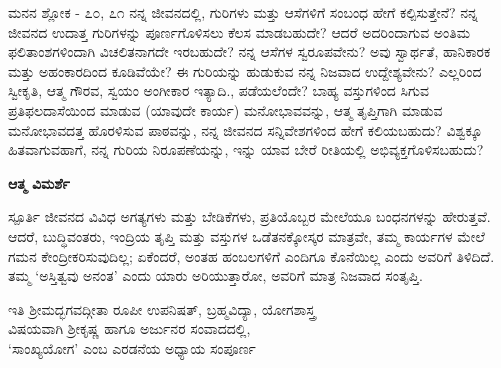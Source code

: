 \newpage
\begin{mananam}{\mananamfont \large \large {ಮನನ ಶ್ಲೋಕ - ೭೦, ೭೧}}
\footnotesize \mananamtext ನನ್ನ ಜೀವನದಲ್ಲಿ, ಗುರಿಗಳು ಮತ್ತು ಆಸೆಗಳಿಗೆ ಸಂಬಂಧ ಹೇಗೆ ಕಲ್ಪಿಸುತ್ತೇನೆ? ನನ್ನ ಜೀವನದ ಉದಾತ್ತ   ಗುರಿಗಳನ್ನು ಪೂರ್ಣಗೊಳಿಸಲು ಕೆಲಸ ಮಾಡಬಹುದೇ? ಆದರೆ ಅದರಿಂದಾಗುವ ಅಂತಿಮ ಫಲಿತಾಂಶಗಳಿಂದಾಗಿ ವಿಚಲಿತನಾಗದೇ ಇರಬಹುದೇ? ನನ್ನ ಆಸೆಗಳ ಸ್ವರೂಪವೇನು? ಅವು ಸ್ವಾರ್ಥತೆ, ಹಾನಿಕಾರಕ ಮತ್ತು ಅಹಂಕಾರದಿಂದ ಕೂಡಿವೆಯೇ? ಈ ಗುರಿಯನ್ನು ಹುಡುಕುವ ನನ್ನ ನಿಜವಾದ ಉದ್ದೇಶ್ಯವೇನು? ಎಲ್ಲರಿಂದ ಸ್ವೀಕೃತಿ, ಆತ್ಮ ಗೌರವ, ಸ್ವಯಂ  ಅಂಗೀಕಾರ ಇತ್ಯಾದಿ., ಪಡೆಯಲೆಂದೇ?  ಬಾಹ್ಯ ವಸ್ತುಗಳಿಂದ ಸಿಗುವ ಪ್ರತಿಫಲದಾಸೆಯಿಂದ ಮಾಡುವ (ಯಾವುದೇ ಕಾರ್ಯ) ಮನೋಭಾವವನ್ನು, ಆತ್ಮ ತೃಪ್ತಿಗಾಗಿ ಮಾಡುವ ಮನೋಭಾವದತ್ತ ಹೊರಳಿಸುವ ಪಾಠವನ್ನು, ನನ್ನ ಜೀವನದ ಸನ್ನಿವೇಶಗಳಿಂದ ಹೇಗೆ ಕಲಿಯಬಹುದು? ವಿಶ್ವಕ್ಕೂ ಹಿತವಾಗುವಹಾಗೆ, ನನ್ನ ಗುರಿಯ ನಿರೂಪಣೆಯನ್ನು, ಇನ್ನು ಯಾವ ಬೇರೆ ರೀತಿಯಲ್ಲಿ  ಅಭಿವ್ಯಕ್ತಗೊಳಿಸಬಹುದು? 
\end{mananam}
\WritingHand\enspace\textbf{ಆತ್ಮ ವಿಮರ್ಶೆ}
\begin{inspiration}{\mananamfont \large \large ಸ್ಪೂರ್ತಿ}
\footnotesize \mananamtext ಜೀವನದ ವಿವಿಧ ಅಗತ್ಯಗಳು ಮತ್ತು ಬೇಡಿಕೆಗಳು, ಪ್ರತಿಯೊಬ್ಬರ ಮೇಲೆಯೂ ಬಂಧನಗಳನ್ನು ಹೇರುತ್ತವೆ. ಆದರೆ, ಬುದ್ಧಿವಂತರು, ಇಂದ್ರಿಯ ತೃಪ್ತಿ ಮತ್ತು ವಸ್ತುಗಳ ಒಡೆತನಕ್ಕೋಸ್ಕರ  ಮಾತ್ರವೇ, ತಮ್ಮ ಕಾರ್ಯಗಳ ಮೇಲೆ ಗಮನ ಕೇಂದ್ರೀಕರಿಸುವುದಿಲ್ಲ; ಏಕೆಂದರೆ,  ಅಂತಹ ಹಂಬಲಗಳಿಗೆ ಎಂದಿಗೂ ಕೊನೆಯಿಲ್ಲ ಎಂದು ಅವರಿಗೆ ತಿಳಿದಿದೆ.
 ತಮ್ಮ ‘ಅಸ್ತಿತ್ವವು ಅನಂತ’ ಎಂದು ಯಾರು ಅರಿಯುತ್ತಾರೋ, ಅವರಿಗೆ ಮಾತ್ರ ನಿಜವಾದ ಸಂತೃಪ್ತಿ.
\end{inspiration}
\newpage

\begin{center}
{\color{black}
ಇತಿ ಶ್ರೀಮದ್ಭಗವದ್ಗೀತಾ  ರೂಪೀ ಉಪನಿಷತ್, ಬ್ರಹ್ಮವಿದ್ಯಾ, ಯೋಗಶಾಸ್ತ್ರ\\ ವಿಷಯವಾಗಿ ಶ್ರೀಕೃಷ್ಣ ಹಾಗೂ ಅರ್ಜುನರ ಸಂವಾದದಲ್ಲಿ, \\‘ಸಾಂಖ್ಯಯೋಗ’ ಎಂಬ ಎರಡನೆಯ ಅಧ್ಯಾಯ  ಸಂಪೂರ್ಣ}
\end{center}